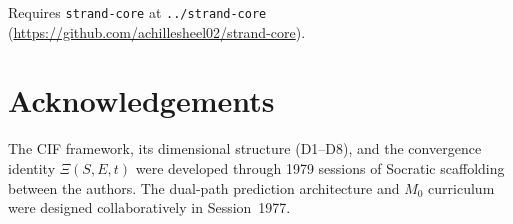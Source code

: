 \documentclass[11pt,a4paper]{article}
\begin{document}
Requires \texttt{strand-core} at \texttt{../strand-core}\\(\url{https://github.com/achillesheel02/strand-core}).

\section*{Acknowledgements}

The CIF framework, its dimensional structure (D1--D8), and the convergence identity $\Xi(S, E, t)$ were developed through 1979 sessions of Socratic scaffolding between the authors. The dual-path prediction architecture and $M_0$ curriculum were designed collaboratively in Session~1977.
\end{document}
